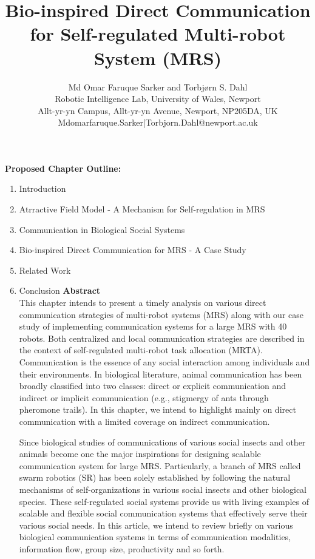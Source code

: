 \documentclass[10pt,a4paper]{article}
\author{Md Omar Faruque Sarker and Torbj{\o}rn S. Dahl\\ %
\small
Robotic Intelligence Lab, University of Wales, Newport\\
\small
Allt-yr-yn Campus, Allt-yr-yn Avenue, Newport, NP205DA, UK\\
\small
Mdomarfaruque.Sarker|Torbjorn.Dahl@newport.ac.uk
}
\title{Bio-inspired Direct Communication for Self-regulated Multi-robot System (MRS)}
\begin{document}
\maketitle
\textbf{Proposed Chapter Outline:}
\begin{enumerate}
\item Introduction
\item Atrractive Field Model - A Mechanism for Self-regulation in MRS
\item Communication in Biological Social Systems
\item Bio-inspired Direct Communication for MRS - A Case Study
\item Related Work
\item Conclusion
\newpage 
\textbf{\large Abstract}\\
This chapter intends to present a timely analysis on various direct communication strategies of multi-robot systems (MRS) along with our case study of implementing communication systems for  a large MRS with 40 robots. Both  centralized and local communication strategies are described in the context of self-regulated multi-robot task allocation (MRTA). Communication is the essence of any social interaction among individuals and their environments. In biological literature, animal communication has been broadly classified into two classes: direct or explicit communication and indirect or implicit communication (e.g., stigmergy of ants through pheromone trails). In this chapter, we intend to highlight mainly on direct communication with a limited coverage on indirect communication.

Since biological studies of communications of various social insects and other animals become one the major inspirations for designing scalable communication system for large MRS. Particularly, a branch of MRS called swarm robotics (SR) has been solely established by following the natural mechanisms of self-organizations in various social insects and other biological species. These self-regulated social systems provide us with living examples of scalable and flexible social communication systems  that effectively serve their various social needs.  In this article, we intend to review briefly on various biological communication systems in terms of communication modalities, information flow, group size, productivity and so forth.
 

\end{enumerate}
\end{document}

